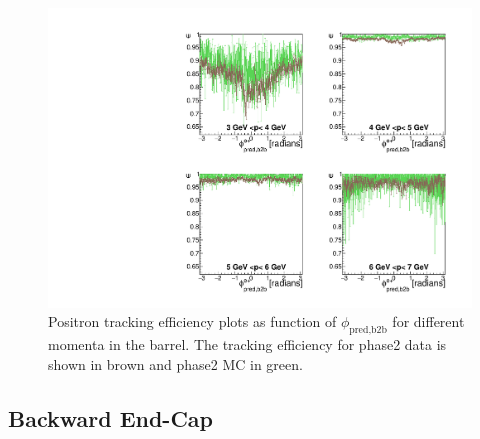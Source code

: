 \documentclass[a4paper,11pt,twosided,final,german,openbib,pdftex,listof=totoc,bibliography=totoc]{scrbook}
\begin{document}
\begin{figure}[!htbp]
	\centering
	\includegraphics[width=\textwidth]{Plots/master/xPMPhiepBarrel}
	\caption[Momentum $\phi_{\textrm{pred,b2b}}$ Positron Barrel Efficiency Phase2]{Positron tracking efficiency plots as function of $\phi_{\textrm{pred,b2b}}$ for different momenta in the barrel. The tracking efficiency for phase2 data is shown in brown and phase2 MC in green.}
		\label{plt:xPMPhiepBarrel}
\end{figure}

\newpage
\subsection{Backward End-Cap}
\label{sec:MEC}
\end{document}
